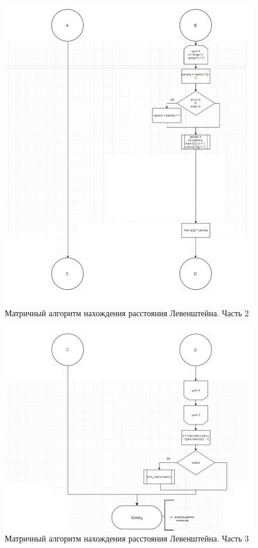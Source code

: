 \documentclass[a4paper,12pt]{report}
\begin{document}
\begin{center}
		\newpage
		\begin{figure}[h!]
			\includegraphics[width=1\linewidth]{lev_mat_end3.jpg}
			\caption{Матричный алгоритм нахождения расстояния Левенштейна. Часть 2}
			\label{ris:matLev2}
		\end{figure}
	
		\newpage
		\begin{figure}[h!]
			\includegraphics[width=1\linewidth]{lev_mat_end2.jpg}
			\caption{Матричный алгоритм нахождения расстояния Левенштейна. Часть 3}
			\label{ris:matLev3}
		\end{figure}
	\end{center}
\end{document}
